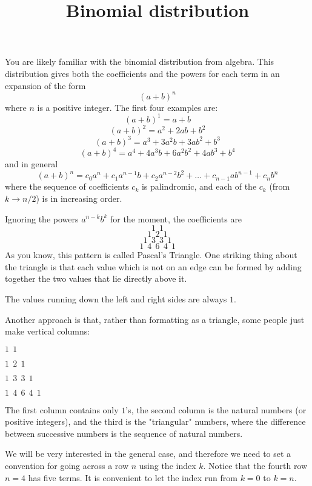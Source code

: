 \documentclass[11pt, oneside]{article}   	%
\title{Binomial distribution}
\date{}							%
\begin{document}
\maketitle
\Large
You are likely familiar with the binomial distribution from algebra.  This distribution gives both the coefficients and the powers for each term in an expansion of the form
\[ (a+b)^n \]
where $n$ is a positive integer.  The first four examples are:
\[ (a+b)^1 = a + b \]
\[ (a+b)^2 = a^2 + 2ab + b^2 \]
\[ (a+b)^3 = a^3 + 3a^2b + 3ab^2 + b^3 \]
\[ (a+b)^4 = a^4 + 4a^3b + 6a^2b^2 + 4ab^3 + b^4 \]
and in general
\[ (a+b)^n = c_0a^n + c_1a^{n-1}b + c_2a^{n-2}b^2 + \dots + c_{n-1}ab^{n-1} + c_nb^n \]
where the sequence of coefficients $c_k$ is palindromic, and each of the $c_k$ (from $k \rightarrow n/2$) is in increasing order.

Ignoring the powers $a^{n-k}b^k$ for the moment, the coefficients are
\[ 1 \ \ 1 \]
\[ 1 \ \ 2 \ \ 1 \]
\[ 1 \ \ 3 \ \ 3 \ \ 1 \]
\[ 1 \ \ 4 \ \ 6 \ \ 4 \ \ 1 \]
As you know, this pattern is called Pascal's Triangle.  One striking thing about the triangle is that each value which is not on an edge can be formed by adding together the two values that lie directly above it.

The values running down the left and right sides are always $1$.

Another approach is that, rather than formatting as a triangle, some people just make vertical columns:

$1 \ \ 1$

$1 \ \ 2 \ \ 1$

$1 \ \ 3 \ \ 3 \ \ 1$

$1 \ \ 4 \ \ 6 \ \ 4 \ \ 1$

The first column contains only $1$'s, the second column is the natural numbers (or positive integers), and the third is the "triangular" numbers, where the difference between successive numbers is the sequence of natural numbers.

We will be very interested in the general case, and therefore we need to set a convention for going across a row $n$ using the index $k$.  Notice that the fourth row $n = 4$ has five terms.  It is convenient to let the index run from $k=0$ to $k = n$.
\end{document}
